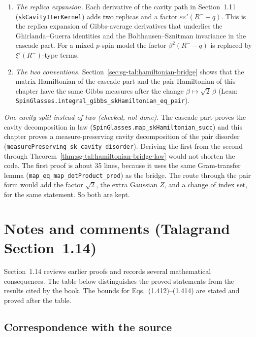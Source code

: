 \begin{remark}
\begin{enumerate}
 At high temperature the leading term of the overlaps is deterministic, and Section~1.10 describes the Gaussian fluctuations around it. This is an interpretation, not a proved statement.
\item \emph{The replica expansion.} Each derivative of the cavity path in Section~1.11 (\texttt{skCavityIterKernel}) adds two replicas and a factor $\varepsilon\varepsilon'(R^--q)$. This is the replica expansion of Gibbs-average derivatives that underlies the Ghirlanda--Guerra identities
 and the Bolthausen--Sznitman invariance in the cascade part. For a mixed $p$-spin model the factor $\beta^2(R^--q)$ is replaced by $\xi'(R^-)$-type terms.
\item \emph{The two conventions.} Section~\ref{sec:sg-tal:hamiltonian-bridge} shows that the matrix Hamiltonian of the cascade part and the pair Hamiltonian of this chapter have the same Gibbs measures after the change $\beta\mapsto\sqrt2\,\beta$ (Lean: \texttt{SpinGlasses.integral\_gibbs\_skHamiltonian\_eq\_pair}).
\end{enumerate}
\emph{One cavity split instead of two (checked, not done).} The cascade part proves the cavity decomposition in law (\texttt{SpinGlasses.map\_skHamiltonian\_succ}) and this chapter proves a measure-preserving cavity decomposition of the pair disorder (\texttt{measurePreserving\_sk\_cavity\_disorder}).
Deriving the first from the second through Theorem~\ref{thm:sg-tal:hamiltonian-bridge-law} would not shorten the code. The first proof is about 35 lines, because it uses the same Gram-transfer lemma (\texttt{map\_eq\_map\_dotProduct\_prod}) as the bridge.
The route through the pair form would add the factor $\sqrt2$, the extra Gaussian $Z$, and a change of index set, for the same statement. So both are kept.
\end{remark}

\section{Notes and comments (Talagrand Section~1.14)}\label{sec:sg-tal:notes-comments}

Section~1.14 reviews earlier proofs and records several mathematical consequences.
The table below distinguishes the proved statements from the results cited by the book.
The bounds for Eqs.~(1.412)--(1.414) are stated and proved after the table.

\subsection{Correspondence with the source}

